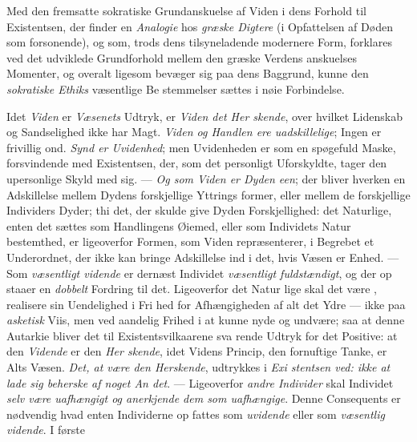 Med den fremsatte sokratiske Grundanskuelse af Viden i
dens Forhold til Existentsen, der finder en \emph{Analogie} hos
\emph{græske Digtere} (i Opfattelsen af Døden som forsonende),
og som, trods dens tilsyneladende modernere Form, forklares
ved det udviklede Grundforhold mellem den græske Verdens\-%
anskuelses Momenter, og overalt ligesom bevæger sig paa dens
Baggrund, kunne den \emph{sokratiske Ethiks} væsentlige Be\-%
stemmelser sættes i nøie Forbindelse.

Idet \emph{Viden} er \emph{Væsenets} Udtryk, er \emph{Viden det Her\-%
skende}, over hvilket Lidenskab og Sandselighed ikke har
Magt. \emph{Viden og Handlen ere uadskillelige}; Ingen er
frivillig ond. \emph{Synd er Uvidenhed}; men Uvidenheden er
som en spøgefuld Maske, forsvindende med Existentsen, der,
som det personligt Uforskyldte, tager den upersonlige Skyld
med sig. --- \emph{Og som Viden er Dyden een}; der bliver
hverken en Adskillelse mellem Dydens forskjellige Yttrings\-%
former, eller mellem de forskjellige Individers Dyder; thi det,
der skulde give Dyden Forskjellighed: det Naturlige, enten det
sættes som Handlingens Øiemed, eller som Individets Natur\-%
bestemthed, er ligeoverfor Formen, som Viden repræsenterer,
i Begrebet et Underordnet, der ikke kan bringe Adskillelse ind
i det, hvis Væsen er Enhed. --- Som \emph{væsentligt vidende}
er dernæst Individet \emph{væsentligt fuldstændigt}, og der op\-%
staaer en \emph{dobbelt} Fordring til det. Ligeoverfor det Natur\-%
lige skal det være , realisere sin Uendelighed i Fri\-%
hed for Afhængigheden af alt det Ydre --- ikke paa \emph{asketisk}
Viis, men ved aandelig Frihed i at kunne nyde og undvære;
saa at denne Autarkie bliver det til Existentsvilkaarene sva\-%
rende Udtryk for det Positive: at den \emph{Vidende} er den \emph{Her\-%
skende}, idet Videns Princip, den fornuftige Tanke, er Alts
Væsen. \emph{Det, at være den Herskende}, udtrykkes i \emph{Exi\-%
stentsen ved: ikke at lade sig beherske af noget An\-%
det}. --- Ligeoverfor \emph{andre Individer} skal Individet \emph{selv
være uafhængigt og anerkjende dem som uafhængige}.
Denne Consequents er nødvendig hvad enten Individerne op\-%
fattes som \emph{uvidende} eller som \emph{væsentlig vidende}. I første
